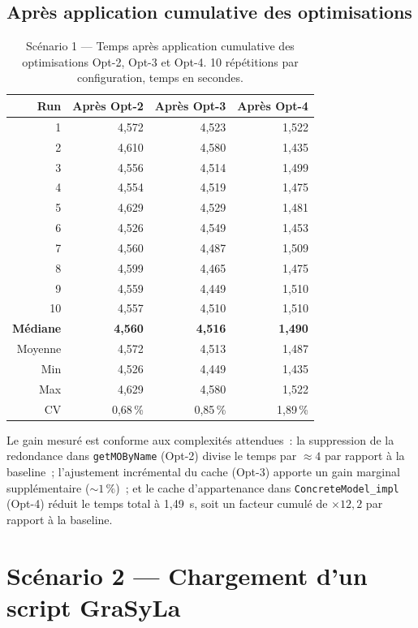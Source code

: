 \subsection*{Après application cumulative des optimisations}

\begin{table}[h]
\centering
\caption{Scénario 1 --- Temps après application cumulative des
optimisations Opt-2, Opt-3 et Opt-4. 10 répétitions par configuration,
temps en secondes.}
\begin{tabular}{rrrr}
\hline
\textbf{Run} & \textbf{Après Opt-2} & \textbf{Après Opt-3} & \textbf{Après Opt-4} \\
\hline
1  & 4,572 & 4,523 & 1,522 \\
2  & 4,610 & 4,580 & 1,435 \\
3  & 4,556 & 4,514 & 1,499 \\
4  & 4,554 & 4,519 & 1,475 \\
5  & 4,629 & 4,529 & 1,481 \\
6  & 4,526 & 4,549 & 1,453 \\
7  & 4,560 & 4,487 & 1,509 \\
8  & 4,599 & 4,465 & 1,475 \\
9  & 4,559 & 4,449 & 1,510 \\
10 & 4,557 & 4,510 & 1,510 \\
\hline
\textbf{Médiane} & \textbf{4,560} & \textbf{4,516} & \textbf{1,490} \\
Moyenne          & 4,572          & 4,513          & 1,487 \\
Min              & 4,526          & 4,449          & 1,435 \\
Max              & 4,629          & 4,580          & 1,522 \\
CV               & 0,68\,\%       & 0,85\,\%       & 1,89\,\% \\
\hline
\end{tabular}
\end{table}

Le gain mesuré est conforme aux complexités attendues~: la suppression
de la redondance dans \texttt{getMOByName} (Opt-2) divise le temps par
$\approx 4$ par rapport à la baseline~; l'ajustement incrémental du
cache (Opt-3) apporte un gain marginal supplémentaire ($\sim 1\,\%$)~;
et le cache d'appartenance dans \texttt{ConcreteModel\_impl} (Opt-4)
réduit le temps total à 1,49~s, soit un facteur cumulé de $\times 12{,}2$
par rapport à la baseline.


\section{Scénario 2 — Chargement d'un script GraSyLa}
\label{ann:mesures-s2}

